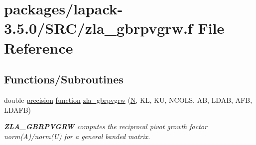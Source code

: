 \hypertarget{zla__gbrpvgrw_8f}{}\section{packages/lapack-\/3.5.0/\+S\+R\+C/zla\+\_\+gbrpvgrw.f File Reference}
\label{zla__gbrpvgrw_8f}
\subsection*{Functions/\+Subroutines}
\begin{DoxyCompactItemize}
\item 
double \hyperlink{numinquire_8h_a2c8e616467665d0b2814d4c1589ba74e}{precision} \hyperlink{afunc_8m_a7b5e596df91eadea6c537c0825e894a7}{function} \hyperlink{group__complex16GBcomputational_gaa2680ba9e0dc10bfbc62319acf1ff067}{zla\+\_\+gbrpvgrw} (\hyperlink{polmisc_8c_a0240ac851181b84ac374872dc5434ee4}{N}, K\+L, K\+U, N\+C\+O\+L\+S, A\+B, L\+D\+A\+B, A\+F\+B, L\+D\+A\+F\+B)
\begin{DoxyCompactList}\small\item\em {\bfseries Z\+L\+A\+\_\+\+G\+B\+R\+P\+V\+G\+R\+W} computes the reciprocal pivot growth factor norm(\+A)/norm(U) for a general banded matrix. \end{DoxyCompactList}\end{DoxyCompactItemize}
